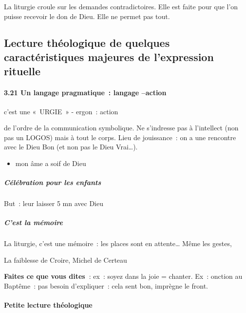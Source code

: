 La liturgie croule sur les demandes contradictoires. Elle est faite pour
que l'on puisse recevoir le don de Dieu. Elle ne permet pas tout.

\hypertarget{lecture-thuxe9ologique-de-quelques-caractuxe9ristiques-majeures-de-lexpression-rituelle}{%
\subsection{Lecture théologique de quelques caractéristiques
majeures de l'expression
rituelle}\label{lecture-thuxe9ologique-de-quelques-caractuxe9ristiques-majeures-de-lexpression-rituelle}}

\hypertarget{un-langage-pragmatique-langage-action}{%
\paragraph{3.21 Un langage pragmatique~: langage
--action}\label{un-langage-pragmatique-langage-action}}

c'est une «~URGIE~» - ergon~: action

de l'ordre de la communication symbolique. Ne s'indresse pas à
l'intellect (non pas un LOGOS) mais à tout le
corps. Lieu de jouissance~: on a une rencontre avec le Dieu Bon (et non
pas le Dieu Vrai\ldots).

\begin{itemize}
\item
  mon âme a soif de Dieu
\end{itemize}

\hypertarget{cuxe9luxe9bration-pour-les-enfants}{%
\subparagraph{Célébration pour les
enfants}\label{cuxe9luxe9bration-pour-les-enfants}}

But~: leur laisser 5 mn avec Dieu

\hypertarget{cest-la-muxe9moire}{%
\subparagraph{C'est la mémoire}\label{cest-la-muxe9moire}}

La liturgie, c'est une mémoire~: les places sont en attente\ldots{} Même
les gestes,

La faiblesse de Croire, Michel de Certeau

\textbf{Faites ce que vous dites~}: ex~: soyez dans la joie = chanter.
Ex~: onction au Baptême~: pas besoin d'expliquer~: cela sent bon,
imprègne le front.


\hypertarget{petite-lecture-thuxe9ologique}{%
\paragraph{Petite lecture
théologique}\label{petite-lecture-thuxe9ologique}}

